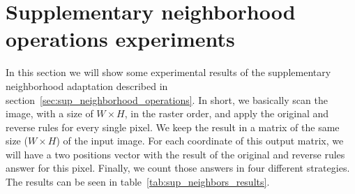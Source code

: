 \section{Supplementary neighborhood operations experiments}
\label{sec:sno_experiments}
In this section we will show some experimental results of the supplementary neighborhood adaptation described in section~\ref{sec:sup_neighborhood_operations}. In short, we basically scan the image, with a size of $W \times H$, in the raster order, and apply the original and reverse rules for every single pixel. We keep the result in a matrix of the same size ($W \times H$) of the input image. For each coordinate of this output matrix, we will have a two positions vector with the result of the original and reverse rules answer for this pixel. Finally, we count those answers in four different strategies. The results can be seen in table~\ref{tab:sup_neighbors_results}.

